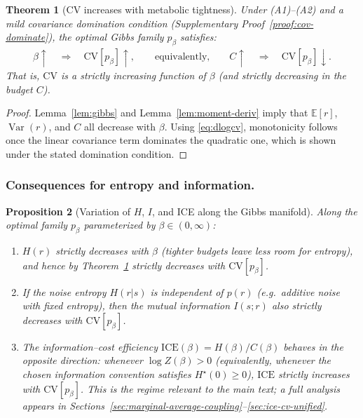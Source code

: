 \documentclass[11pt]{article}
\DeclareMathOperator{\Var}{Var}
\newcommand{\EE}{\mathbb{E}}
\newtheorem{theorem}{Theorem}[section]
\newtheorem{proposition}[theorem]{Proposition}
\theoremstyle{remark}
\theoremstyle{definition}
\begin{document}
\begin{theorem}[CV increases with metabolic tightness]
\label{thm:cv-monotone}
Under (A1)--(A2) and a mild covariance domination condition
(Supplementary Proof~\ref{proof:cov-dominate}),
the optimal Gibbs family $p_\beta$ satisfies:
\begin{align}
\beta \uparrow \quad \Longrightarrow \quad
\mathrm{CV}[p_\beta] \uparrow ,
\qquad\text{equivalently,}\qquad
C \uparrow \quad \Longrightarrow \quad \mathrm{CV}[p_\beta] \downarrow .
\end{align}
That is, $\mathrm{CV}$ is a strictly increasing function of $\beta$ (and strictly decreasing in the budget $C$).
\end{theorem}

\begin{proof}
Lemma~\ref{lem:gibbs} and Lemma~\ref{lem:moment-deriv} imply that 
$\EE[r]$, $\Var(r)$, and $C$ all decrease with $\beta$.  
Using \eqref{eq:dlogcv}, monotonicity follows once the linear covariance term dominates the quadratic one, which is shown under the stated domination condition.
\end{proof}

\subsubsection{Consequences for entropy and information.}

\begin{proposition}[Variation of $H$, $I$, and ICE along the Gibbs manifold]
\label{prop:H-I-vs-CV}
Along the optimal family $p_\beta$ parameterized by $\beta\in(0,\infty)$:
\begin{enumerate}[label=(\alph*)]
\item $H(r)$ strictly \emph{decreases} with $\beta$ (tighter budgets leave less room for entropy), and hence by Theorem~\ref{thm:cv-monotone} strictly \emph{decreases} with $\mathrm{CV}[p_\beta]$.
\item If the noise entropy $H(r|s)$ is independent of $p(r)$
(e.g.\ additive noise with fixed entropy),
then the mutual information $I(s;r)$ also strictly decreases with $\mathrm{CV}[p_\beta]$.
\item The \emph{information--cost efficiency} $\mathrm{ICE}(\beta)=H(\beta)/C(\beta)$ behaves in the opposite direction: whenever $\log Z(\beta)>0$ (equivalently, whenever the chosen information convention satisfies $H^\star(0)\ge 0$), $\mathrm{ICE}$ strictly \emph{increases} with $\mathrm{CV}[p_\beta]$.  This is the regime relevant to the main text; a full analysis appears in Sections~\ref{sec:marginal-average-coupling}--\ref{sec:ice-cv-unified}.
\end{enumerate}
\end{proposition}
\end{document}

